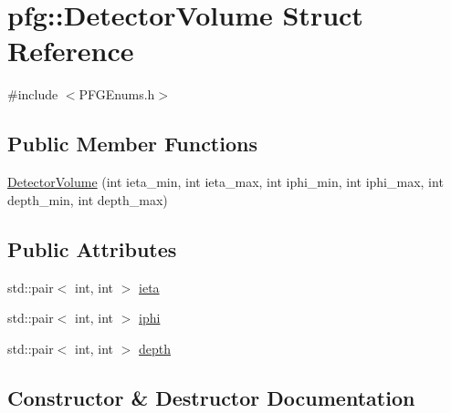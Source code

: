 \hypertarget{structpfg_1_1_detector_volume}{}\section{pfg\+:\+:Detector\+Volume Struct Reference}
\label{structpfg_1_1_detector_volume}


{\ttfamily \#include $<$P\+F\+G\+Enums.\+h$>$}

\subsection*{Public Member Functions}
\begin{DoxyCompactItemize}
\item 
\hyperlink{structpfg_1_1_detector_volume_afd51ad87f6b231c603b40d79554c0ec0}{Detector\+Volume} (int ieta\+\_\+min, int ieta\+\_\+max, int iphi\+\_\+min, int iphi\+\_\+max, int depth\+\_\+min, int depth\+\_\+max)
\end{DoxyCompactItemize}
\subsection*{Public Attributes}
\begin{DoxyCompactItemize}
\item 
std\+::pair$<$ int, int $>$ \hyperlink{structpfg_1_1_detector_volume_ab05437b19ed1d9f0421956cbd359573c}{ieta}
\item 
std\+::pair$<$ int, int $>$ \hyperlink{structpfg_1_1_detector_volume_a7c0c028f18d816c5ff25ca5c3fefa32a}{iphi}
\item 
std\+::pair$<$ int, int $>$ \hyperlink{structpfg_1_1_detector_volume_a51a1170588cd0adc09d437338c1f3e9b}{depth}
\end{DoxyCompactItemize}


\subsection{Constructor \& Destructor Documentation}
\hypertarget{structpfg_1_1_detector_volume_afd51ad87f6b231c603b40d79554c0ec0}{}
